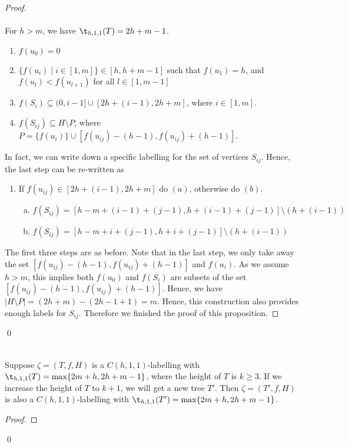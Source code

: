 \begin{proof}
\\
\\
For $h >m$, we have $\t_{h,1,1}(T) = 2h+m-1$. 
\begin{enumerate}[(1)]
\item $f(u_0) = 0$
\item $\{f(u_i) \mid i \in [1,m]\} \in [h,h+m-1]$ such that $f(u_{1}) = h$, and $f(u_{l}) <f(u_{l+1})$ for all $l \in [1,m-1]$
\item $f(S_i) \subseteq (0, i-1] \cup [2h+(i-1), 2h+m]$, where $i \in [1,m]$. 
\item $f(S_{ij}) \subseteq H\setminus P$, where $P = \{f(u_i)\} \cup  [f(u_{ij}) - (h-1), f(u_{ij}) + (h-1)]$. 
\end{enumerate} 
In fact, we can write down a specific labelling for the set of vertices $S_{ij}$. Hence, the last step can be re-written as 
\begin{enumerate}[(4)]
\item If $f(u_{ij}) \in [2h+(i-1), 2h+m]$ do $(a)$, otherwise do $(b)$.
\begin{enumerate}[(a)]
\item $f(S_{ij}) = [h-m+(i-1)+(j-1), h+(i-1)+(j-1)] \setminus (h+(i-1))$
\item $f(S_{ij}) = [h-m+i+(j-1), h+i+(j-1)] \setminus (h+(i-1))$
\end{enumerate}
\end{enumerate}
The first three steps are as before. Note that in the last step, we only take away the set $ [f(u_{ij}) - (h-1), f(u_{ij}) + (h-1)]$ and $f(u_i)$. As we assume $h > m$, this implies both $f(u_0)$ and $f(S_i)$ are subsets of the set $[f(u_{ij}) - (h-1), f(u_{ij}) + (h-1)]$. Hence, we have $|H \setminus P| = (2h+m) - (2h-1+1) = m$. Hence, this construction also provides enough labels for $S_{ij}$. Therefore we finished the proof of this proposition. 
\end{proof}
\qed
\\
\\
\begin{proposition}
\label{cor:k>3}
Suppose $\zeta = (T, f, H)$ is a $C(h,1,1)$-labelling with $\t_{h,1,1}(T) = \max\{2m+h, 2h+m-1\}$, where the height of $T$ is $k \ge 3$. If we increase the height of $T$ to $k+1$, we will get a new tree $T'$. Then $\zeta = (T', f, H)$ is also a $C(h,1,1)$-labelling with $\t_{h,1,1}(T') = \max\{2m+h, 2h+m-1\}$.  
\end{proposition}
\begin{proof}
\end{proof}
\qed

